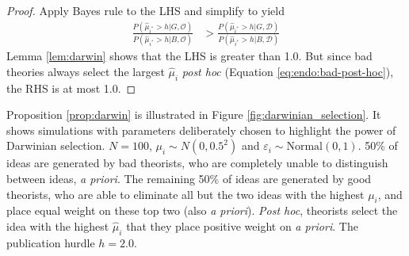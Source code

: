 \documentclass[12pt,english]{article}
\theoremstyle{plain}
\theoremstyle{plain}
\begin{document}
\begin{proof}
Apply Bayes rule to the LHS and simplify to yield
\begin{align*}
\frac{P\left(\hat{\mu}_{i^{\ast}}>h|G,\mathcal{O}\right)}{P\left(\hat{\mu}_{i^{\ast}}>h|B,\mathcal{O}\right)} & >\frac{P\left(\hat{\mu}_{i^{\ast}}>h|G,\mathcal{\mathcal{D}}\right)}{P\left(\hat{\mu}_{i^{\ast}}>h|B,\mathcal{\mathcal{D}}\right)}
\end{align*}
Lemma \ref{lem:darwin} shows that the LHS is greater than 1.0. But since bad theories always select the largest
$\hat{\mu}_{i}$ \emph{post hoc} (Equation \eqref{eq:endo:bad-post-hoc}), the RHS is at most 1.0. 
\end{proof}

Proposition \ref{prop:darwin} is illustrated in Figure \ref{fig:darwinian_selection}. It shows simulations with parameters deliberately chosen to highlight the power of Darwinian selection. $N=100$, $\mu_i \sim N(0, 0.5^2)$ and $\varepsilon_i \sim \text{Normal}(0, 1)$. 50\% of ideas are generated by bad theorists, who are completely unable to distinguish between ideas, \emph{a priori}. The remaining 50\% of ideas are generated by good theorists, who are able to eliminate all but the two ideas with the highest $\mu_i$, and place equal weight on these top two (also \emph{a priori}). \emph{Post hoc}, theorists select the idea with the highest $\hat{\mu}_i$ that they place positive weight on \emph{a priori}. The publication hurdle $h=2.0$.
\end{document}
